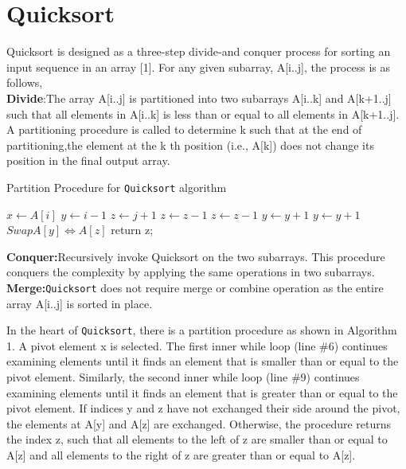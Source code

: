 \documentclass[a4paper, 10pt,twocolumn]{article}
\begin{document}
\section{Quicksort}
Quicksort is designed as a three-step divide-and conquer process for sorting an input sequence in an array [1]. For any given subarray, A[i..j], the process is as follows,
\\\textbf{Divide}:The array A[i..j] is partitioned into two subarrays A[i..k] and A[k+1..j] such that all elements in A[i..k] is less than or equal to all elements in A[k+1..j]. A partitioning procedure is called to determine k such that at the end of partitioning,the element at the k th position (i.e., A[k]) does not change its position in the final output array.
\begin{algorithm}
  \caption{Partition Procedure for \texttt{Quicksort} algorithm}
  \begin{algorithmic}[1]
     \newline
     \newline
     \State $x \leftarrow A[i]$
     \State $y \leftarrow i-1$
     \State $z \leftarrow j+1$
        \State $z \leftarrow z-1$
            \State $z \leftarrow z-1$
        \EndWhile
        \State $y \leftarrow y+1$
            \State $y \leftarrow y+1$
        \EndWhile
            \State $ Swap A[y] \Leftrightarrow A[z] $
        \Else
            \State return z;
        \EndIf

     \EndWhile
     \EndProcedure
  \end{algorithmic}
\end{algorithm}
\newline
\newline
\textbf{Conquer:}Recursively invoke Quicksort on the two subarrays. This procedure conquers the complexity by applying the same operations in two subarrays.
\\\textbf{Merge:}\texttt{Quicksort} does not require merge or combine operation as the entire array A[i..j] is sorted in place.

In the heart of \texttt{Quicksort}, there is a partition procedure as shown in Algorithm 1. A pivot element x is selected. The first inner while loop (line \#6) continues examining elements until it finds an element that is smaller than or equal to the pivot element. Similarly, the second inner while loop (line \#9) continues examining elements until it finds an element that is greater than or equal to the pivot element. If indices y and z have not exchanged their side around the pivot, the elements at A[y] and A[z] are exchanged. Otherwise, the procedure returns the index z, such that all elements to the left of z are smaller than or equal to A[z] and all elements to the right of z are greater than or equal to A[z].
\end{document}
